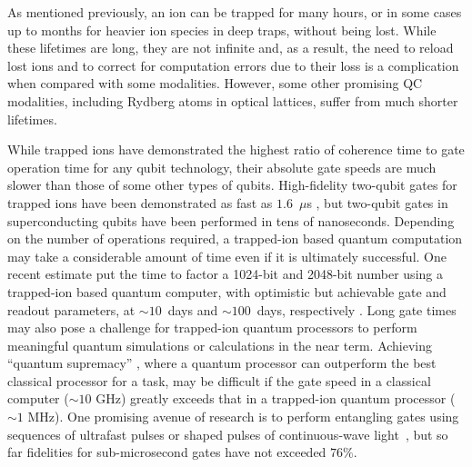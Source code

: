 \documentclass[%
reprint,
 amsmath,amssymb,
]{revtex4-1}
\begin{document}
As mentioned previously, an ion can be trapped for many hours, or in some cases up to months for heavier ion species in deep traps, without being lost. While these lifetimes are long, they are not infinite and, as a result, the need to reload lost ions and to correct for computation errors due to their loss is a complication when compared with some modalities. However, some other promising QC modalities, including Rydberg atoms in optical lattices, suffer from much shorter lifetimes.

While trapped ions have demonstrated the highest ratio of coherence time to gate operation time for any qubit technology, their absolute gate speeds are much slower than those of some other types of qubits. High-fidelity two-qubit gates for trapped ions have been demonstrated as fast as $1.6$~$\mu$s \cite{SchaferFastIonGates2018}, but two-qubit gates in superconducting qubits have been performed in tens of nanoseconds. Depending on the number of operations required, a trapped-ion based quantum computation may take a considerable amount of time even if it is ultimately successful. One recent estimate put the time to factor a 1024-bit and 2048-bit number using a trapped-ion based quantum computer, with optimistic but achievable gate and readout parameters, at ${\sim}10$~days and ${\sim}100$~days, respectively \cite{LekitscheMicrowaveBlueprint2017}. Long gate times may also pose a challenge for trapped-ion quantum processors to perform meaningful quantum simulations or calculations in the near term. Achieving ``quantum supremacy'' \cite{HarrowQuantumSupremacy}, where a quantum processor can outperform the best classical processor for a task, may be difficult if the gate speed in a classical computer (${\sim}10$ GHz) greatly exceeds that in a trapped-ion quantum processor (${\sim}1$ MHz). One promising avenue of research is to perform entangling gates using sequences of ultrafast pulses \cite{WongCamposUltrafast2017} or shaped pulses of continuous-wave light~\cite{SchaferFastIonGates2018}, but so far fidelities for sub-microsecond gates have not exceeded $76 \%$.
\end{document}
